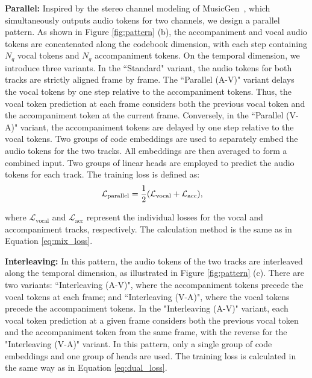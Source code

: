 \textbf{Parallel:}
Inspired by the stereo channel modeling of MusicGen~\cite{copet2024musicgen}, which simultaneously outputs audio tokens for two channels, we design a parallel pattern. As shown in Figure \ref{fig:pattern} (b), the accompaniment and vocal audio tokens are concatenated along the codebook dimension, with each step containing $N_q$ vocal tokens and $N_q$ accompaniment tokens. On the temporal dimension, we introduce three variants. In the ``Standard" variant, the audio tokens for both tracks are strictly aligned frame by frame. The ``Parallel (A-V)" variant delays the vocal tokens by one step relative to the accompaniment tokens. Thus, the vocal token prediction at each frame considers both the previous vocal token and the accompaniment token at the current frame. 
Conversely, in the ``Parallel (V-A)" variant, the accompaniment tokens are delayed by one step relative to the vocal tokens. 
Two groups of code embeddings are used to separately embed the audio tokens for the two tracks. All embeddings are then averaged to form a combined input. Two groups of linear heads are employed to predict the audio tokens for each track. The training loss is defined as:
\vspace{-3pt}
\begin{equation}
\vspace{-8pt}
\label{eq:dual_loss}
\begin{aligned}
\mathcal{L}_{\text{parallel}} &= \frac{1}{2} (\mathcal{L}_{\text{vocal}} +  \mathcal{L}_{\text{acc}}),
\end{aligned} 
\vspace{-3pt}
\end{equation}

where  $\mathcal{L}_{\text{vocal}} $ and $ \mathcal{L}_{\text{acc}} $ represent the individual losses for the vocal and accompaniment tracks, respectively. The calculation method is the same as in Equation \ref{eq:mix_loss}.

\textbf{Interleaving:}
In this pattern, the audio tokens of the two tracks are interleaved along the temporal dimension, as illustrated in Figure \ref{fig:pattern} (c). There are two variants: ``Interleaving (A-V)", where the accompaniment tokens precede the vocal tokens at each frame; and ``Interleaving (V-A)", where the vocal tokens precede the accompaniment tokens. 
In the "Interleaving (A-V)" variant, each vocal token prediction at a given frame considers both the previous vocal token and the accompaniment token from the same frame, with the reverse for the "Interleaving (V-A)" variant.
In this pattern, only a single group of code embeddings and one group of heads are used. The training loss is calculated in the same way as in Equation \ref{eq:dual_loss}.

